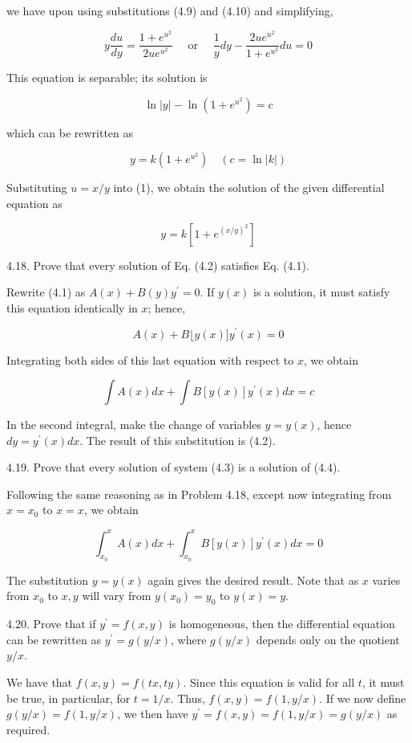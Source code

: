 \documentclass[10pt]{article}
\begin{document}
we have upon using substitutions (4.9) and (4.10) and simplifying,

$$
y \frac{d u}{d y}=\frac{1+e^{u^{2}}}{2 u e^{u^{2}}} \quad \text { or } \quad \frac{1}{y} d y-\frac{2 u e^{u^{2}}}{1+e^{u^{2}}} d u=0
$$

This equation is separable; its solution is

$$
\ln |y|-\ln \left(1+e^{u^{2}}\right)=c
$$

which can be rewritten as


\begin{equation*}
y=k\left(1+e^{u^{2}}\right) \quad(c=\ln |k|) \tag{1}
\end{equation*}


Substituting $u=x / y$ into (1), we obtain the solution of the given differential equation as

$$
y=k\left[1+e^{(x / y)^{2}}\right]
$$

4.18. Prove that every solution of Eq. (4.2) satisfies Eq. (4.1).

Rewrite (4.1) as $A(x)+B(y) y^{\prime}=0$. If $y(x)$ is a solution, it must satisfy this equation identically in $x$; hence,

$$
A(x)+B\lfloor y(x)] y^{\prime}(x)=0
$$

Integrating both sides of this last equation with respect to $x$, we obtain

$$
\int A(x) d x+\int B[y(x)] y^{\prime}(x) d x=c
$$

In the second integral, make the change of variables $y=y(x)$, hence $d y=y^{\prime}(x) d x$. The result of this substitution is (4.2).

4.19. Prove that every solution of system (4.3) is a solution of (4.4).

Following the same reasoning as in Problem 4.18, except now integrating from $x=x_{0}$ to $x=x$, we obtain

$$
\int_{x_{0}}^{x} A(x) d x+\int_{x_{0}}^{x} B[y(x)] y^{\prime}(x) d x=0
$$

The substitution $y=y(x)$ again gives the desired result. Note that as $x$ varies from $x_{0}$ to $x, y$ will vary from $y\left(x_{0}\right)=y_{0}$ to $y(x)=y$.

4.20. Prove that if $y^{\prime}=f(x, y)$ is homogeneous, then the differential equation can be rewritten as $y^{\prime}=g(y / x)$, where $g(y / x)$ depends only on the quotient $y / x$.

We have that $f(x, y)=f(t x, t y)$. Since this equation is valid for all $t$, it must be true, in particular, for $t=1 / x$. Thus, $f(x, y)=f(1, y / x)$. If we now define $g(y / x)=f(1, y / x)$, we then have $y^{\prime}=f(x, y)=f(1, y / x)=g(y / x)$ as required.
\end{document}
